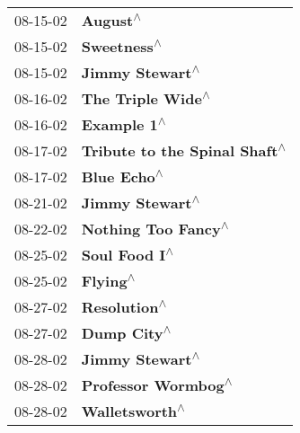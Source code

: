 \begin{supertabular}{p{0.25\columnwidth}p{0.75\columnwidth}}
 08-15-02 &                                                                   \textbf{August\textsuperscript{$\wedge$}} \\
 08-15-02 &                                                                \textbf{Sweetness\textsuperscript{$\wedge$}} \\
 08-15-02 &                                                            \textbf{Jimmy Stewart\textsuperscript{$\wedge$}} \\
 08-16-02 &                                                          \textbf{The Triple Wide\textsuperscript{$\wedge$}} \\
 08-16-02 &                                                                \textbf{Example 1\textsuperscript{$\wedge$}} \\
 08-17-02 &                                              \textbf{Tribute to the Spinal Shaft\textsuperscript{$\wedge$}} \\
 08-17-02 &                                                                \textbf{Blue Echo\textsuperscript{$\wedge$}} \\
 08-21-02 &                                                            \textbf{Jimmy Stewart\textsuperscript{$\wedge$}} \\
 08-22-02 &                                                        \textbf{Nothing Too Fancy\textsuperscript{$\wedge$}} \\
 08-25-02 &                                                              \textbf{Soul Food I\textsuperscript{$\wedge$}} \\
 08-25-02 &                                                                   \textbf{Flying\textsuperscript{$\wedge$}} \\
 08-27-02 &                                                               \textbf{Resolution\textsuperscript{$\wedge$}} \\
 08-27-02 &                                                                \textbf{Dump City\textsuperscript{$\wedge$}} \\
 08-28-02 &                                                            \textbf{Jimmy Stewart\textsuperscript{$\wedge$}} \\
 08-28-02 &                                                        \textbf{Professor Wormbog\textsuperscript{$\wedge$}} \\
 08-28-02 &                                                             \textbf{Walletsworth\textsuperscript{$\wedge$}} \\

\end{supertabular}

